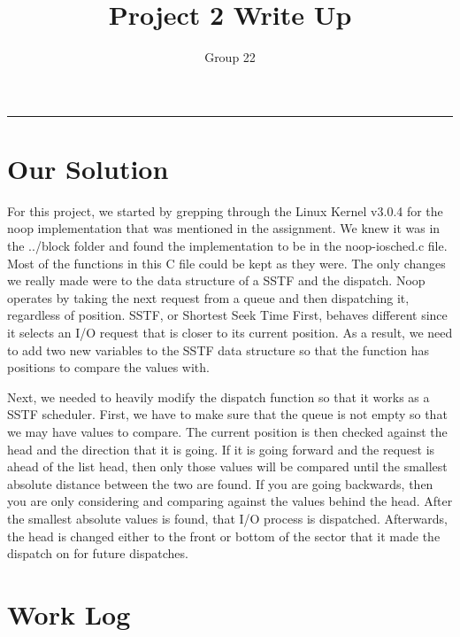 \documentclass[letterpaper,10pt,notitlepage,fleqn]{article}
\title{Project 2 Write Up}
\author{Group 22}
\begin{document}
\maketitle
\hrule

\section*{Our Solution}
For this project, we started by grepping through the Linux Kernel v3.0.4 for the noop implementation that was mentioned in the assignment. We knew it was in the ../block folder and found the implementation to be in the noop-iosched.c file. Most of the functions in this C file could be kept as they were. The only changes we really made were to the data structure of a SSTF and the dispatch. Noop operates by taking the next request from a queue and then dispatching it, regardless of position. SSTF, or Shortest Seek Time First, behaves different since it selects an I/O request that is closer to its current position. As a result, we need to add two new variables to the SSTF data structure so that the function has positions to compare the values with. 

Next, we needed to heavily modify the dispatch function so that it works as a SSTF scheduler. First, we have to make sure that the queue is not empty so that we may have values to compare. The current position is then checked against the head and the direction that it is going. If it is going forward and the request is ahead of the list head, then only those values will be compared until the smallest absolute distance between the two are found. If you are going backwards, then you are only considering and comparing against the values behind the head. After the smallest absolute values is found, that I/O process is dispatched. Afterwards, the head is changed either to the front or bottom of the sector that it made the dispatch on for future dispatches. 

\section*{Work Log}
\end{document}
